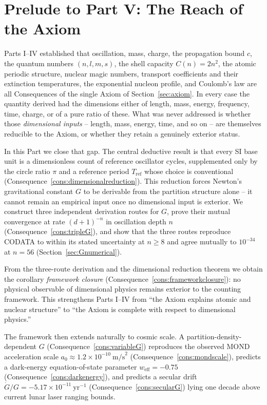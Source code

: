 \documentclass[11pt,twocolumn,a4paper]{article}
\theoremstyle{axiomstyle}
\theoremstyle{conseqstyle}
\theoremstyle{definition}
\theoremstyle{remark}
\begin{document}
\section*{Prelude to Part V: The Reach of the Axiom}

Parts I--IV established that oscillation, mass, charge, the propagation bound $c$, the quantum numbers $(n,l,m,s)$, the shell capacity $C(n)=2n^{2}$, the atomic periodic structure, nuclear magic numbers, transport coefficients and their extinction temperatures, the exponential nucleon profile, and Coulomb's law are all Consequences of the single Axiom of Section~\ref{sec:axiom}. In every case the quantity derived had the dimensions either of length, mass, energy, frequency, time, charge, or of a pure ratio of these. What was never addressed is whether those \emph{dimensional inputs} -- length, mass, energy, time, and so on -- are themselves reducible to the Axiom, or whether they retain a genuinely exterior status.

In this Part we close that gap. The central deductive result is that every SI base unit is a dimensionless count of reference oscillator cycles, supplemented only by the circle ratio $\pi$ and a reference period $T_{\mathrm{ref}}$ whose choice is conventional (Consequence~\ref{cons:dimensionalreduction}). This reduction forces Newton's gravitational constant $G$ to be derivable from the partition structure alone -- it cannot remain an empirical input once no dimensional input is exterior. We construct three independent derivation routes for $G$, prove their mutual convergence at rate $(d+1)^{-n}$ in oscillation depth $n$ (Consequence~\ref{cons:tripleG}), and show that the three routes reproduce CODATA to within its stated uncertainty at $n\geq 8$ and agree mutually to $10^{-34}$ at $n=56$ (Section~\ref{sec:Gnumerical}).

From the three-route derivation and the dimensional reduction theorem we obtain the corollary \emph{framework closure} (Consequence~\ref{cons:frameworkclosure}): no physical observable of dimensional physics remains exterior to the counting framework. This strengthens Parts I--IV from ``the Axiom explains atomic and nuclear structure'' to ``the Axiom is complete with respect to dimensional physics.''

The framework then extends naturally to cosmic scale. A partition-density-dependent $G$ (Consequence~\ref{cons:variableG}) reproduces the observed MOND acceleration scale $a_{0}\approx 1.2\times10^{-10}~\mathrm{m/s}^{2}$ (Consequence~\ref{cons:mondscale}), predicts a dark-energy equation-of-state parameter $w_{\mathrm{eff}}=-0.75$ (Consequence~\ref{cons:darkenergy}), and predicts a secular drift $\dot G/G=-5.17\times10^{-11}~\mathrm{yr}^{-1}$ (Consequence~\ref{cons:secularG}) lying one decade above current lunar laser ranging bounds.
\end{document}
